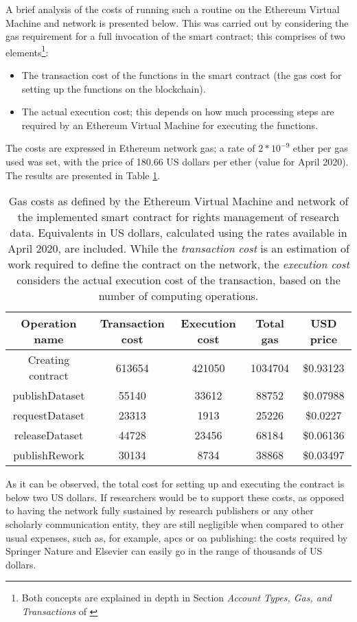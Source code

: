 A brief analysis of the costs of running such a routine on the Ethereum Virtual Machine and network is presented below. This was carried out by considering the gas requirement for a full invocation of the smart contract; this comprises of two elements\footnote{Both concepts are explained in depth in Section \emph{Account Types, Gas, and Transactions} of \cite{ethdocs}}:

\begin{itemize}
    \item The transaction cost of the functions in the smart contract (the gas cost for setting up the functions on the blockchain).
    \item The actual execution cost; this depends on how much processing steps are required by an Ethereum Virtual Machine for executing the functions.
\end{itemize}

The costs are expressed in Ethereum network gas; a
rate of $2*10^{-9}$ ether per gas used was set, with the price of 180.66 US dollars per ether (value for April 2020). The results are presented in Table \ref{tbl:eth}. 
\begin{table}
\begin{tabular}{ |c|c|c|c|c| } 
 \hline
 Operation name & Transaction cost & Execution cost & Total gas & USD price \\
 \hline
 \hline
 Creating contract & 613654 & 421050 & 1034704 & \$0.93123 \\
 \hline
 publishDataset & 55140 & 33612 & 88752 & \$0.07988 \\
 \hline
 requestDataset & 23313 & 1913 & 25226 & \$0.0227 \\
 \hline
 releaseDataset & 44728 & 23456 & 68184 & \$0.06136 \\
 \hline
 publishRework & 30134 & 8734 & 38868 & \$0.03497 \\
 \hline
\end{tabular}
\caption{Gas costs as defined by the Ethereum Virtual Machine and network of the implemented smart contract for rights management of research data. Equivalents in US dollars, calculated using the rates available in April 2020, are included. While the \emph{transaction cost} is an estimation of work required to define the contract on the network, the \emph{execution cost} considers the actual execution cost of the transaction, based on the number of computing operations.}
\label{tbl:eth}
\end{table}

As it can be observed, the total cost for setting up and executing the contract is below two US dollars. If researchers would be to support these costs, as opposed to having the
network fully sustained by research publishers or any other scholarly communication entity, they are still negligible when compared to other usual expenses, such as, for example, \glspl{apc} or \gls{oa} publishing: the costs required by Springer Nature and Elsevier can easily go in the range of thousands of US dollars\cite{elsevierapc,snoa}. 

